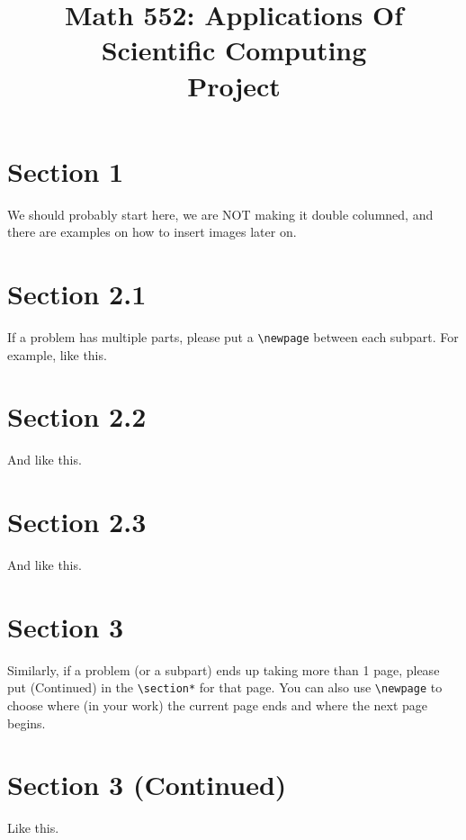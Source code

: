 \documentclass[letter]{amsart}
\title[Math 552: Applications Of Scientific Computing $\mid$ Project ]{Math 552: Applications Of Scientific Computing\\Project}
\author[\StudentName]{\StudentName}
\begin{document}
\maketitle


\section*{Section 1}

We should probably start here, we are NOT making it double columned, and there are examples on how to insert images later on.

\newpage

\section*{Section 2.1}
If a problem has multiple parts, please put a \verb!\newpage! between each subpart.  For example, like this.
\newpage

\section*{Section 2.2}
And like this.
\newpage

\section*{Section 2.3}
And like this.
\newpage

\section*{Section 3}
Similarly, if a problem (or a subpart) ends up taking more than 1 page, please put (Continued) in the \verb!\section*! for that page.  You can also use \verb!\newpage! to choose where (in your work) the current page ends and where the next page begins.
\newpage

\section*{Section 3 (Continued)}
Like this.
\newpage
\end{document}
